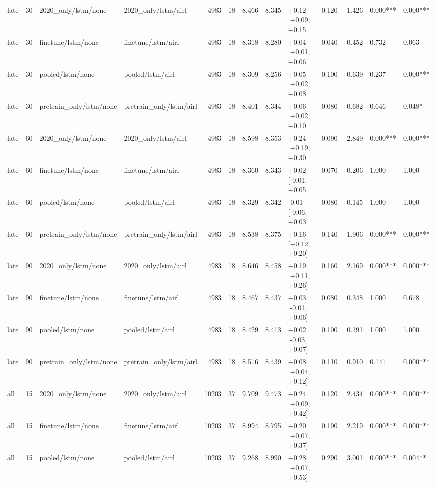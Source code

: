 \begin{tabular}{lrllrrrrlrrll}
late & 30 & 2020_only/lstm/none & 2020_only/lstm/airl & 4983 & 18 & 8.466 & 8.345 & +0.12 [+0.09, +0.15] & 0.120 & 1.426 & 0.000*** & 0.000*** \\
late & 30 & finetune/lstm/none & finetune/lstm/airl & 4983 & 18 & 8.318 & 8.280 & +0.04 [+0.01, +0.06] & 0.040 & 0.452 & 0.732 & 0.063 \\
late & 30 & pooled/lstm/none & pooled/lstm/airl & 4983 & 18 & 8.309 & 8.256 & +0.05 [+0.02, +0.08] & 0.100 & 0.639 & 0.237 & 0.000*** \\
late & 30 & pretrain_only/lstm/none & pretrain_only/lstm/airl & 4983 & 18 & 8.401 & 8.344 & +0.06 [+0.02, +0.10] & 0.080 & 0.682 & 0.646 & 0.048* \\
late & 60 & 2020_only/lstm/none & 2020_only/lstm/airl & 4983 & 18 & 8.598 & 8.353 & +0.24 [+0.19, +0.30] & 0.090 & 2.849 & 0.000*** & 0.000*** \\
late & 60 & finetune/lstm/none & finetune/lstm/airl & 4983 & 18 & 8.360 & 8.343 & +0.02 [-0.01, +0.05] & 0.070 & 0.206 & 1.000 & 1.000 \\
late & 60 & pooled/lstm/none & pooled/lstm/airl & 4983 & 18 & 8.329 & 8.342 & -0.01 [-0.06, +0.03] & 0.080 & -0.145 & 1.000 & 1.000 \\
late & 60 & pretrain_only/lstm/none & pretrain_only/lstm/airl & 4983 & 18 & 8.538 & 8.375 & +0.16 [+0.12, +0.20] & 0.140 & 1.906 & 0.000*** & 0.000*** \\
late & 90 & 2020_only/lstm/none & 2020_only/lstm/airl & 4983 & 18 & 8.646 & 8.458 & +0.19 [+0.11, +0.26] & 0.160 & 2.169 & 0.000*** & 0.000*** \\
late & 90 & finetune/lstm/none & finetune/lstm/airl & 4983 & 18 & 8.467 & 8.437 & +0.03 [-0.01, +0.06] & 0.080 & 0.348 & 1.000 & 0.678 \\
late & 90 & pooled/lstm/none & pooled/lstm/airl & 4983 & 18 & 8.429 & 8.413 & +0.02 [-0.03, +0.07] & 0.100 & 0.191 & 1.000 & 1.000 \\
late & 90 & pretrain_only/lstm/none & pretrain_only/lstm/airl & 4983 & 18 & 8.516 & 8.439 & +0.08 [+0.04, +0.12] & 0.110 & 0.910 & 0.141 & 0.000*** \\
all & 15 & 2020_only/lstm/none & 2020_only/lstm/airl & 10203 & 37 & 9.709 & 9.473 & +0.24 [+0.09, +0.42] & 0.120 & 2.434 & 0.000*** & 0.000*** \\
all & 15 & finetune/lstm/none & finetune/lstm/airl & 10203 & 37 & 8.994 & 8.795 & +0.20 [+0.07, +0.37] & 0.190 & 2.219 & 0.000*** & 0.000*** \\
all & 15 & pooled/lstm/none & pooled/lstm/airl & 10203 & 37 & 9.268 & 8.990 & +0.28 [+0.07, +0.53] & 0.290 & 3.001 & 0.000*** & 0.004** \\

\end{tabular}
